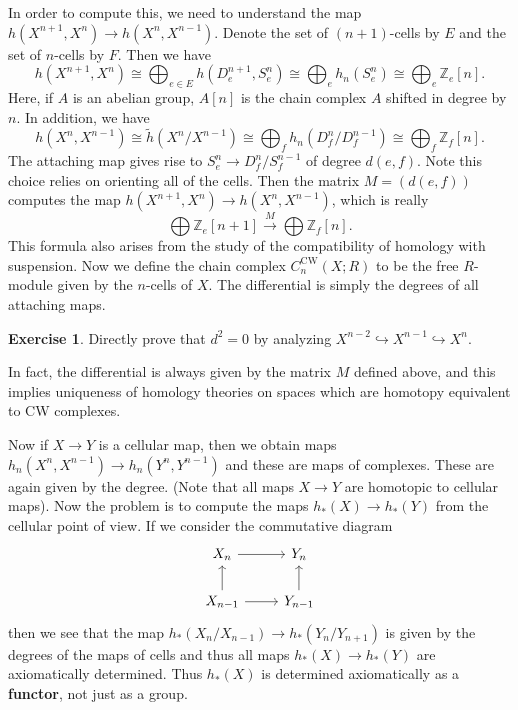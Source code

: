 \documentclass[leqno, openany]{memoir}
\theoremstyle{definition}
\newtheorem{exer}[thm]{Exercise}
\theoremstyle{remark}
\theoremstyle{plain}
\theoremstyle{definition}
\theoremstyle{remark}
\newcommand{\Z}{\mathbb{Z}}
\newcommand{\mr}[1]{\mathrm{#1}}
\newcommand{\wt}[1]{\widetilde{#1}}
\begin{document}
In order to compute this, we need to understand the map $h(X^{n+1}, X^n) \to h(X^n, X^{n-1})$. Denote the set of $(n+1)$-cells by $E$ and the set of $n$-cells by $F$. Then we have
\[ h(X^{n+1}, X^n) \cong \bigoplus_{e \in E} h(D_e^{n+1}, S_e^n) \cong \bigoplus_e h_n(S^n_e) \cong \bigoplus_e \Z_e [n]. \]
Here, if $A$ is an abelian group, $A[n]$ is the chain complex $A$ shifted in degree by $n$. In addition, we have
\[ h(X^n, X^{n-1}) \cong \wt{h}(X^n / X^{n-1}) \cong \bigoplus_f h_n(D_f^n / D_f^{n-1}) \cong \bigoplus_f \Z_f [n]. \]
The attaching map gives rise to $S_e^n \to D_f^n / S_f^{n-1}$ of degree $d(e,f)$. Note this choice relies on orienting all of the cells. Then the matrix $M = (d(e,f))$ computes the map $h(X^{n+1}, X^n) \to h(X^n, X^{n-1})$, which is really
\[ \bigoplus \Z_e [n+1] \xrightarrow{M} \bigoplus \Z_f [n]. \]
This formula also arises from the study of the compatibility of homology with suspension. Now we define the chain complex $C_n^{\mr{CW}}(X; R)$ to be the free $R$-module given by the $n$-cells of $X$. The differential is simply the degrees of all attaching maps.

\begin{exer}
    Directly prove that $d^2 = 0$ by analyzing $X^{n-2} \hookrightarrow X^{n-1} \hookrightarrow X^n$.
\end{exer}

In fact, the differential is always given by the matrix $M$ defined above, and this implies uniqueness of homology theories on spaces which are homotopy equivalent to CW complexes.

Now if $X \to Y$ is a cellular map, then we obtain maps $h_n(X^n, X^{n-1}) \to h_n(Y^n, Y^{n-1})$ and these are maps of complexes. These are again given by the degree. (Note that all maps $X \to Y$ are homotopic to cellular maps). Now the problem is to compute the maps $h_*(X) \to h_*(Y)$ from the cellular point of view. If we consider the commutative diagram
\begin{equation*}
\begin{tikzcd}
    X_n \arrow{r} & Y_n \\
    X_{n-1} \arrow{r} \arrow{u} & Y_{n-1} \arrow{u}
\end{tikzcd}
\end{equation*}
then we see that the map $h_*(X_n / X_{n-1}) \to h_*(Y_n / Y_{n+1})$ is given by the degrees of the maps of cells and thus all maps $h_*(X) \to h_*(Y)$ are axiomatically determined. Thus $h_*(X)$ is determined axiomatically as a \textbf{functor}, not just as a group.
\end{document}
